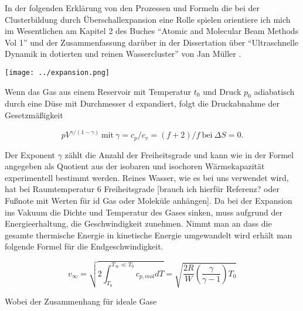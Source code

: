 In der folgenden Erklärung von den Prozessen und Formeln die bei der Clusterbildung durch Überschallexpansion eine Rolle spielen orientiere ich mich im Wesentlichen am Kapitel 2 des Buches \enquote{Atomic and Molecular Beam Methods Vol 1}\cite{scoles1988} und der Zusammenfassung darüber in der Dissertation über \enquote{Ultraschnelle Dynamik in dotierten und reinen Wassercluster} von Jan Müller \cite{mul13}.

\begin{center}
\begin{minipage}{\linewidth}
\centering
\texttt{[image: ../expansion.png]}%
 \label{fig:Machexpansion}
\end{minipage} 
\end{center} 

Wenn das Gas aus einem Reservoir mit Temperatur $t_0$ und Druck $p_0$ adiabatisch durch eine Düse mit Durchmesser d expandiert, folgt die Druckabnahme der Gesetzmäßigkeit

\begin{equation}
pV^{\gamma/(1-\gamma)}\ \mbox{mit}\ \gamma=c_p/c_v=(f+2)/f \ \mbox{bei} \ \Delta S=0.
\end{equation}

Der Exponent $\gamma$ zählt die Anzahl der Freiheitsgrade und kann wie in der Formel angegeben als Quotient aus der isobaren und isochoren Wärmekapazität experimentell bestimmt werden. Reines Wasser, wie es bei uns verwendet wird, hat bei Raumtemperatur 6 Freiheitsgrade [brauch ich hierfür Referenz? oder Fußnote mit Werten für id Gas oder Moleküle anhängen]. 
Da bei der Expansion ins Vakuum die Dichte und Temperatur des Gases sinken, muss aufgrund der Energieerhaltung, die Geschwindigkeit zunehmen. 
Nimmt man an dass die gesamte thermische Energie in kinetische Energie umgewandelt wird erhält man folgende Formel für die Endgeschwindigkeit.

\begin{equation}
v_\infty=\sqrt{2\int_{T_0}^{T_\infty \ll T_0} c_{p,mol}dT}= \sqrt{\frac{2R}{W}\left(\frac{\gamma}{\gamma-1}\right)T_0}
\end{equation}

Wobei der Zusammenhang für ideale Gase

